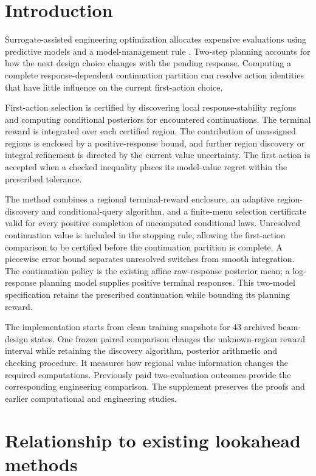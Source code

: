 \documentclass[]{interact}
\begin{document}
\section{Introduction}

Surrogate-assisted engineering optimization allocates expensive evaluations using predictive models and a model-management rule \citep{ref01,ref02,ref03,ref35}. Two-step planning accounts for how the next design choice changes with the pending response. Computing a complete response-dependent continuation partition can resolve action identities that have little influence on the current first-action choice.

First-action selection is certified by discovering local response-stability regions and computing conditional posteriors for encountered continuations. The terminal reward is integrated over each certified region. The contribution of unassigned regions is enclosed by a positive-response bound, and further region discovery or integral refinement is directed by the current value uncertainty. The first action is accepted when a checked inequality places its model-value regret within the prescribed tolerance.

The method combines a regional terminal-reward enclosure, an adaptive region-discovery and conditional-query algorithm, and a finite-menu selection certificate valid for every positive completion of uncomputed conditional laws. Unresolved continuation value is included in the stopping rule, allowing the first-action comparison to be certified before the continuation partition is complete. A piecewise error bound separates unresolved switches from smooth integration. The continuation policy is the existing affine raw-response posterior mean; a log-response planning model supplies positive terminal responses. This two-model specification retains the prescribed continuation while bounding its planning reward.

The implementation starts from clean training snapshots for 43 archived beam-design states. One frozen paired comparison changes the unknown-region reward interval while retaining the discovery algorithm, posterior arithmetic and checking procedure. It measures how regional value information changes the required computations. Previously paid two-evaluation outcomes provide the corresponding engineering comparison. The supplement preserves the proofs and earlier computational and engineering studies.

\section{Relationship to existing lookahead methods}
\end{document}
